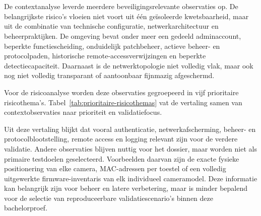 \section{}%
\label{sec:risico-longlist}



De contextanalyse leverde meerdere beveiligingsrelevante observaties op. De belangrijkste risico's vloeien niet voort uit één geïsoleerde kwetsbaarheid, maar uit de combinatie van technische configuratie, netwerkarchitectuur en beheerpraktijken. De omgeving bevat onder meer een gedeeld adminaccount, beperkte functiescheiding, onduidelijk patchbeheer, actieve beheer- en protocolpaden, historische remote-accessverwijzingen en beperkte detectiecapaciteit. Daarnaast is de netwerktopologie niet volledig vlak, maar ook nog niet volledig transparant of aantoonbaar fijnmazig afgeschermd.

Voor de risicoanalyse worden deze observaties gegroepeerd in vijf prioritaire risicothema's. Tabel~\ref{tab:prioritaire-risicothemas} vat de vertaling samen van contextobservaties naar prioriteit en validatiefocus.


Uit deze vertaling blijkt dat vooral authenticatie, netwerkafscherming, beheer- en protocolblootstelling, remote access en logging relevant zijn voor de verdere validatie. Andere observaties blijven nuttig voor het dossier, maar worden niet als primaire testdoelen geselecteerd. Voorbeelden daarvan zijn de exacte fysieke positionering van elke camera, MAC-adressen per toestel of een volledig uitgewerkte firmware-inventaris van elk individueel cameramodel. Deze informatie kan belangrijk zijn voor beheer en latere verbetering, maar is minder bepalend voor de selectie van reproduceerbare validatiescenario's binnen deze bachelorproef.

